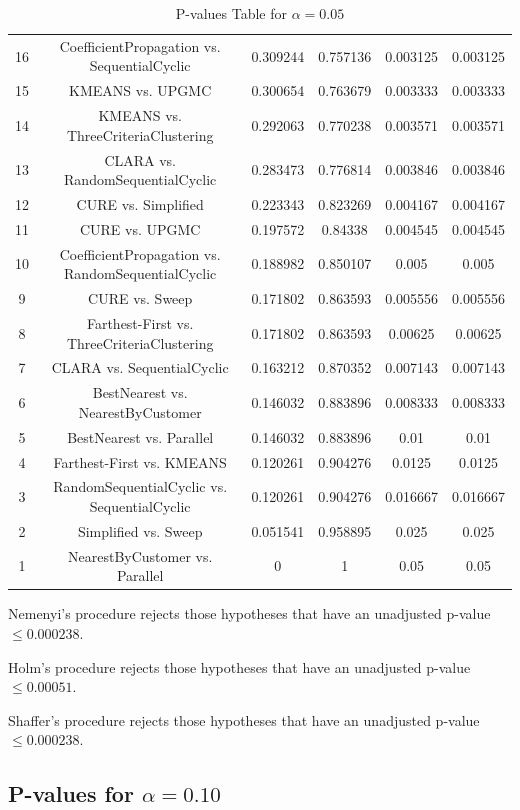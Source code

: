 \documentclass[a4paper,10pt]{article}
\begin{document}
\begin{landscape}
\begin{table}[!htp]
\begin{tabular}{cccccc}
16&CoefficientPropagation vs. SequentialCyclic&0.309244&0.757136&0.003125&0.003125\\
15&KMEANS vs. UPGMC&0.300654&0.763679&0.003333&0.003333\\
14&KMEANS vs. ThreeCriteriaClustering&0.292063&0.770238&0.003571&0.003571\\
13&CLARA vs. RandomSequentialCyclic&0.283473&0.776814&0.003846&0.003846\\
12&CURE vs. Simplified&0.223343&0.823269&0.004167&0.004167\\
11&CURE vs. UPGMC&0.197572&0.84338&0.004545&0.004545\\
10&CoefficientPropagation vs. RandomSequentialCyclic&0.188982&0.850107&0.005&0.005\\
9&CURE vs. Sweep&0.171802&0.863593&0.005556&0.005556\\
8&Farthest-First vs. ThreeCriteriaClustering&0.171802&0.863593&0.00625&0.00625\\
7&CLARA vs. SequentialCyclic&0.163212&0.870352&0.007143&0.007143\\
6&BestNearest vs. NearestByCustomer&0.146032&0.883896&0.008333&0.008333\\
5&BestNearest vs. Parallel&0.146032&0.883896&0.01&0.01\\
4&Farthest-First vs. KMEANS&0.120261&0.904276&0.0125&0.0125\\
3&RandomSequentialCyclic vs. SequentialCyclic&0.120261&0.904276&0.016667&0.016667\\
2&Simplified vs. Sweep&0.051541&0.958895&0.025&0.025\\
1&NearestByCustomer vs. Parallel&0&1&0.05&0.05\\
\hline
\end{tabular}
\caption{P-values Table for $\alpha=0.05$}
\end{table}Nemenyi's procedure rejects those hypotheses that have an unadjusted p-value $\le0.000238$.

Holm's procedure rejects those hypotheses that have an unadjusted p-value $\le0.00051$.

Shaffer's procedure rejects those hypotheses that have an unadjusted p-value $\le0.000238$.

\pagebreak

\subsection{P-values for $\alpha=0.10$}


\end{landscape}
\end{document}
